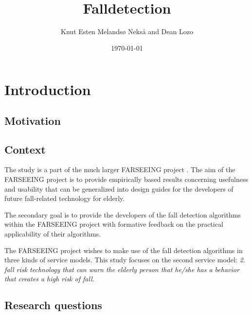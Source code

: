 \documentclass[11pt,twoside,a4paper]{report}
\begin{document}
\title{Falldetection}
\author{Knut Esten Melandsø Nekså and Dean Lozo}
\date{\today}
\maketitle


\begin{abstract}

\end{abstract}

\tableofcontents

\chapter{Introduction}

\section{Motivation}


\section{Context}
The study is a part of the much larger FARSEEING project \citep{FARSEEING}. The aim of the FARSEEING project is to provide empirically based results concerning usefulness and usability that can be generalized into design guides for the developers of future fall-related technology for elderly.

The secondary goal is to provide the developers of the fall detection algorithms within the FARSEEING project with formative feedback on the practical applicability of their algorithms.

The FARSEEING project wishes to make use of the fall detection algorithms in three kinds of service models. This study focuses on the second service model: \emph{2. fall risk technology that can warn the elderly person that he/she has a behavior that creates a high risk of fall.}

\section{Research questions}
\end{document}
